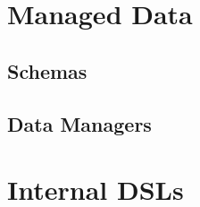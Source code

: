 \section{Managed Data}\label{Managed Data}

\subsection{Schemas}\label{Schemas}

\subsection{Data Managers}\label{Data Managers}

\section{Internal DSLs}\label{Internal DSLs}

